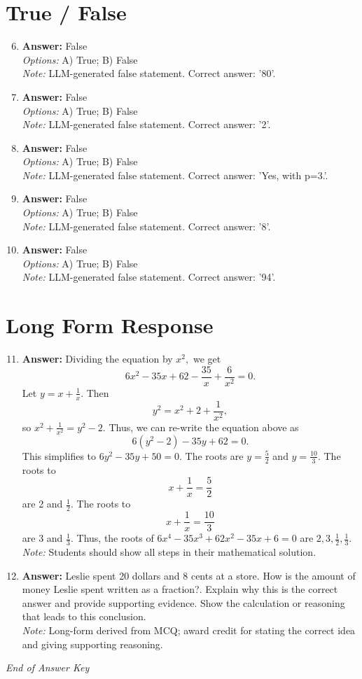 \documentclass[12pt]{article}
\begin{document}
\section*{True / False}
\begin{enumerate}[label=\arabic*.]
\setcounter{enumi}{5}
\item \textbf{Answer:} False
\\ \textit{Options:} A) True; B) False
\\ \textit{Note:} LLM-generated false statement. Correct answer: '80'.
\item \textbf{Answer:} False
\\ \textit{Options:} A) True; B) False
\\ \textit{Note:} LLM-generated false statement. Correct answer: '2'.
\item \textbf{Answer:} False
\\ \textit{Options:} A) True; B) False
\\ \textit{Note:} LLM-generated false statement. Correct answer: 'Yes, with p=3.'.
\item \textbf{Answer:} False
\\ \textit{Options:} A) True; B) False
\\ \textit{Note:} LLM-generated false statement. Correct answer: '8'.
\item \textbf{Answer:} False
\\ \textit{Options:} A) True; B) False
\\ \textit{Note:} LLM-generated false statement. Correct answer: '94'.
\end{enumerate}

\section*{Long Form Response}
\begin{enumerate}[label=\arabic*.]
\setcounter{enumi}{10}
\item \textbf{Answer:} Dividing the equation by $x^2,$ we get \[6 x^2 - 35 x + 62 - \frac{35}{x} + \frac{6}{x^2} = 0.\]Let $y = x + \frac{1}{x}.$ Then \[y^2 = x^2 + 2 + \frac{1}{x^2},\]so $x^2 + \frac{1}{x^2} = y^2 - 2.$ Thus, we can re-write the equation above as \[6(y^2 - 2) - 35 y + 62 = 0.\]This simplifies to $6 y^2 - 35 y + 50 = 0.$ The roots are $y = \frac{5}{2}$ and $y = \frac{10}{3}.$ The roots to \[x + \frac{1}{x} = \frac{5}{2}\]are 2 and $\frac{1}{2}.$ The roots to \[x + \frac{1}{x} = \frac{10}{3}\]are 3 and $\frac{1}{3}.$ Thus, the roots of $6 x^4 - 35 x^3 + 62 x^2 - 35 x + 6 = 0$ are $\boxed{2, 3, \frac{1}{2}, \frac{1}{3}}.$
\\ \textit{Note:} Students should show all steps in their mathematical solution.
\item \textbf{Answer:} Leslie spent 20 dollars and 8 cents at a store. How is the amount of money Leslie spent written as a fraction?. Explain why this is the correct answer and provide supporting evidence. Show the calculation or reasoning that leads to this conclusion.
\\ \textit{Note:} Long-form derived from MCQ; award credit for stating the correct idea and giving supporting reasoning.
\end{enumerate}

\vfill
\noindent\textit{End of Answer Key}
\end{document}
